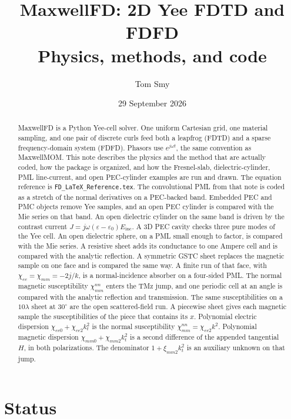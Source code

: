\documentclass[11pt,a4paper]{article}
\title{\textbf{MaxwellFD: 2D Yee FDTD and FDFD}\\[0.35em]
\large Physics, methods, and code}
\author{Tom Smy}
\date{29 September 2026}
\begin{document}
\maketitle

\begin{abstract}
MaxwellFD is a Python Yee-cell solver. One uniform Cartesian grid, one
material sampling, and one pair of discrete curls feed both a leapfrog
(FDTD) and a sparse frequency-domain system (FDFD). Phasors use
$e^{j\omega t}$, the same convention as MaxwellMOM. This note describes the
physics and the method that are actually coded, how the package is
organized, and how the Fresnel-slab, dielectric-cylinder, PML
line-current, and open PEC-cylinder examples are run and drawn. The
equation reference is \texttt{FD\_LaTeX\_Reference.tex}. The convolutional
PML from that note is coded as a stretch of the normal derivatives on a
PEC-backed band.
Embedded PEC and PMC objects remove Yee samples, and an open PEC cylinder
is compared with the Mie series on that band. An open dielectric cylinder
on the same band is driven by the contrast current
$J=j\omega(\varepsilon-\varepsilon_0)E_{\mathrm{inc}}$. A 3D PEC cavity
checks three pure modes of the Yee cell. An open dielectric sphere, on a
PML small enough to factor, is compared with the Mie series. A resistive
sheet adds its conductance to one Ampere cell and is compared with the
analytic reflection. A symmetric GSTC sheet replaces the magnetic sample
on one face and is compared the same way. A finite run of that face, with
$\chi_{ee}=\chi_{mm}=-2j/k$, is a normal-incidence absorber on a four-sided PML.
The normal magnetic susceptibility $\chi_{mm}^{nn}$ enters the TMz jump, and
one periodic cell at an angle is compared with the analytic reflection and
transmission. The same susceptibilities on a $10\lambda$ sheet at $30^\circ$
are the open scattered-field run. A piecewise sheet gives each magnetic
sample the susceptibilities of the piece that contains its $x$.
Polynomial electric dispersion $\chi_{ee0}+\chi_{ee2}k_t^2$ is the
normal susceptibility $\chi_{mm}^{nn}=\chi_{ee2}k^2$. Polynomial
magnetic dispersion $\chi_{mm0}+\chi_{mm2}k_t^2$ is a second difference
of the appended tangential $H$, in both polarizations. The denominator
$1+\xi_{mm2}k_t^2$ is an auxiliary unknown on that jump.
\end{abstract}

\tableofcontents
\newpage

\section{Status}
\label{sec:status}
\end{document}
